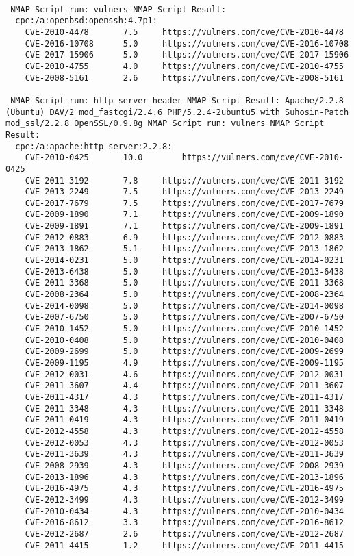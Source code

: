 \documentclass[12pt]{report}
\begin{document}
\begin{lstlisting}

 NMAP Script run: vulners NMAP Script Result: 
  cpe:/a:openbsd:openssh:4.7p1: 
	CVE-2010-4478		7.5		https://vulners.com/cve/CVE-2010-4478
	CVE-2016-10708		5.0		https://vulners.com/cve/CVE-2016-10708
	CVE-2017-15906		5.0		https://vulners.com/cve/CVE-2017-15906
	CVE-2010-4755		4.0		https://vulners.com/cve/CVE-2010-4755
	CVE-2008-5161		2.6		https://vulners.com/cve/CVE-2008-5161

 NMAP Script run: http-server-header NMAP Script Result: Apache/2.2.8 (Ubuntu) DAV/2 mod_fastcgi/2.4.6 PHP/5.2.4-2ubuntu5 with Suhosin-Patch mod_ssl/2.2.8 OpenSSL/0.9.8g NMAP Script run: vulners NMAP Script Result: 
  cpe:/a:apache:http_server:2.2.8: 
	CVE-2010-0425		10.0		https://vulners.com/cve/CVE-2010-0425
	CVE-2011-3192		7.8		https://vulners.com/cve/CVE-2011-3192
	CVE-2013-2249		7.5		https://vulners.com/cve/CVE-2013-2249
	CVE-2017-7679		7.5		https://vulners.com/cve/CVE-2017-7679
	CVE-2009-1890		7.1		https://vulners.com/cve/CVE-2009-1890
	CVE-2009-1891		7.1		https://vulners.com/cve/CVE-2009-1891
	CVE-2012-0883		6.9		https://vulners.com/cve/CVE-2012-0883
	CVE-2013-1862		5.1		https://vulners.com/cve/CVE-2013-1862
	CVE-2014-0231		5.0		https://vulners.com/cve/CVE-2014-0231
	CVE-2013-6438		5.0		https://vulners.com/cve/CVE-2013-6438
	CVE-2011-3368		5.0		https://vulners.com/cve/CVE-2011-3368
	CVE-2008-2364		5.0		https://vulners.com/cve/CVE-2008-2364
	CVE-2014-0098		5.0		https://vulners.com/cve/CVE-2014-0098
	CVE-2007-6750		5.0		https://vulners.com/cve/CVE-2007-6750
	CVE-2010-1452		5.0		https://vulners.com/cve/CVE-2010-1452
	CVE-2010-0408		5.0		https://vulners.com/cve/CVE-2010-0408
	CVE-2009-2699		5.0		https://vulners.com/cve/CVE-2009-2699
	CVE-2009-1195		4.9		https://vulners.com/cve/CVE-2009-1195
	CVE-2012-0031		4.6		https://vulners.com/cve/CVE-2012-0031
	CVE-2011-3607		4.4		https://vulners.com/cve/CVE-2011-3607
	CVE-2011-4317		4.3		https://vulners.com/cve/CVE-2011-4317
	CVE-2011-3348		4.3		https://vulners.com/cve/CVE-2011-3348
	CVE-2011-0419		4.3		https://vulners.com/cve/CVE-2011-0419
	CVE-2012-4558		4.3		https://vulners.com/cve/CVE-2012-4558
	CVE-2012-0053		4.3		https://vulners.com/cve/CVE-2012-0053
	CVE-2011-3639		4.3		https://vulners.com/cve/CVE-2011-3639
	CVE-2008-2939		4.3		https://vulners.com/cve/CVE-2008-2939
	CVE-2013-1896		4.3		https://vulners.com/cve/CVE-2013-1896
	CVE-2016-4975		4.3		https://vulners.com/cve/CVE-2016-4975
	CVE-2012-3499		4.3		https://vulners.com/cve/CVE-2012-3499
	CVE-2010-0434		4.3		https://vulners.com/cve/CVE-2010-0434
	CVE-2016-8612		3.3		https://vulners.com/cve/CVE-2016-8612
	CVE-2012-2687		2.6		https://vulners.com/cve/CVE-2012-2687
	CVE-2011-4415		1.2		https://vulners.com/cve/CVE-2011-4415


\end{lstlisting}
\end{document}
